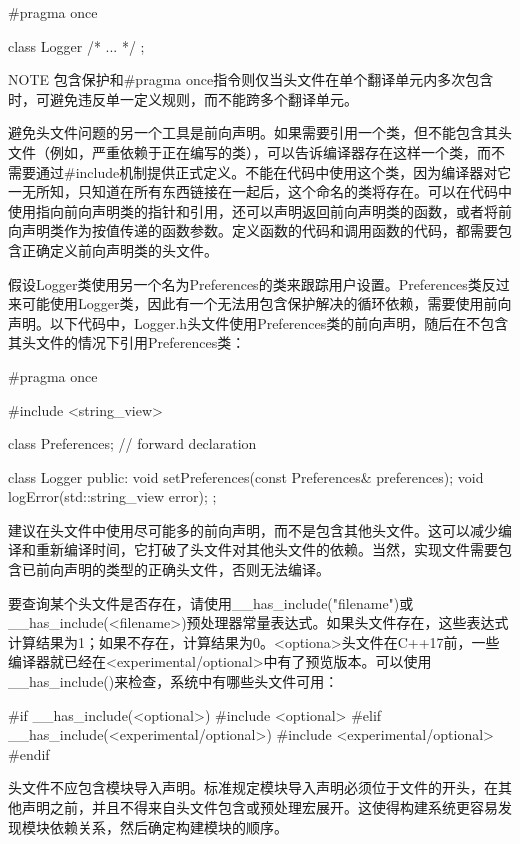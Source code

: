 \begin{cpp}
#pragma once

class Logger { /* ... */ };
\end{cpp}

\begin{myNotic}{NOTE}
包含保护和\#pragma once指令则仅当头文件在单个翻译单元内多次包含时，可避免违反单一定义规则，而不能跨多个翻译单元。
\end{myNotic}


避免头文件问题的另一个工具是前向声明。如果需要引用一个类，但不能包含其头文件（例如，严重依赖于正在编写的类），可以告诉编译器存在这样一个类，而不需要通过\#include机制提供正式定义。不能在代码中使用这个类，因为编译器对它一无所知，只知道在所有东西链接在一起后，这个命名的类将存在。可以在代码中使用指向前向声明类的指针和引用，还可以声明返回前向声明类的函数，或者将前向声明类作为按值传递的函数参数。定义函数的代码和调用函数的代码，都需要包含正确定义前向声明类的头文件。

假设Logger类使用另一个名为Preferences的类来跟踪用户设置。Preferences类反过来可能使用Logger类，因此有一个无法用包含保护解决的循环依赖，需要使用前向声明。以下代码中，Logger.h头文件使用Preferences类的前向声明，随后在不包含其头文件的情况下引用Preferences类：

\begin{cpp}
#pragma once

#include <string_view>

class Preferences; // forward declaration

class Logger
{
    public:
        void setPreferences(const Preferences& preferences);
        void logError(std::string_view error);
};
\end{cpp}

建议在头文件中使用尽可能多的前向声明，而不是包含其他头文件。这可以减少编译和重新编译时间，它打破了头文件对其他头文件的依赖。当然，实现文件需要包含已前向声明的类型的正确头文件，否则无法编译。


要查询某个头文件是否存在，请使用\_\_has\_include("filename")或\_\_has\_include(<filename>)预处理器常量表达式。如果头文件存在，这些表达式计算结果为1；如果不存在，计算结果为0。<optiona>头文件在C++17前，一些编译器就已经在<experimental/optional>中有了预览版本。可以使用\_\_has\_include()来检查，系统中有哪些头文件可用：

\begin{cpp}
#if __has_include(<optional>)
    #include <optional>
#elif __has_include(<experimental/optional>)
    #include <experimental/optional>
#endif
\end{cpp}


头文件不应包含模块导入声明。标准规定模块导入声明必须位于文件的开头，在其他声明之前，并且不得来自头文件包含或预处理宏展开。这使得构建系统更容易发现模块依赖关系，然后确定构建模块的顺序。
















